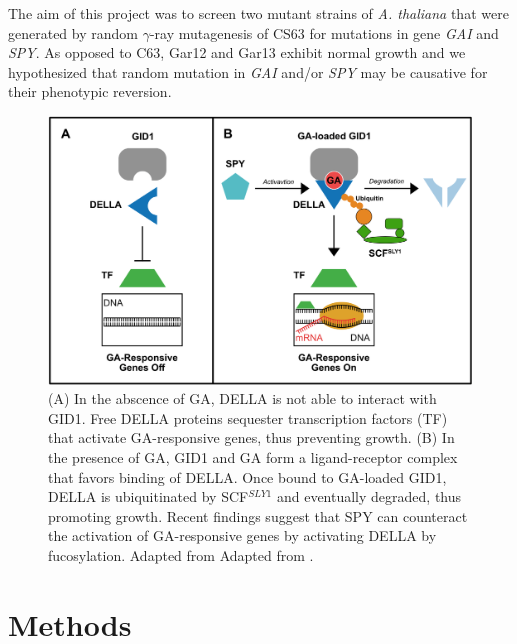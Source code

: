 \documentclass[10pt,a4paper]{article}
\begin{document}


\noindent The aim of this project was to screen two mutant strains of \textit{A. thaliana} that were generated by random $\gamma$-ray mutagenesis of CS63 for mutations in gene \textit{GAI} and \textit{SPY}. As opposed to C63, Gar12 and Gar13 exhibit normal growth and we hypothesized that random mutation in \textit{GAI} and/or \textit{SPY} may be causative for their phenotypic reversion.\\


\begin{figure}[h]
	\centering
	\includegraphics[width=0.6\linewidth]{img/GAI_SPY_Introcut}
	\caption[GAI and SPY pathways]{ (A) In the abscence of GA, DELLA is not able to interact with GID1. Free DELLA proteins sequester transcription factors (TF) that activate GA-responsive genes, thus preventing growth. (B) In the presence of GA, GID1 and GA form a ligand-receptor complex that favors binding of DELLA. Once bound to GA-loaded GID1, DELLA is ubiquitinated by SCF$^{SLY1}$ and eventually degraded, thus promoting growth. Recent findings suggest that SPY can counteract the activation of GA-responsive genes by activating DELLA by fucosylation. Adapted from  Adapted from \cite{hauvermale_gibberellin_2012}.}
	\label{fig:gaspypathway}
\end{figure}




\section*{\large Methods} 
\end{document}
